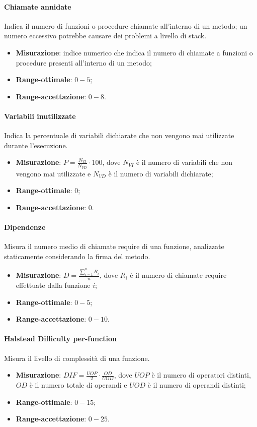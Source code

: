 \paragraph{Chiamate annidate}
Indica il numero di funzioni o procedure chiamate all'interno di un metodo; un numero eccessivo potrebbe causare dei problemi a livello di stack.
\begin{itemize}
\item \textbf{Misurazione}: indice numerico che indica il numero di chiamate a funzioni o procedure presenti all'interno di un metodo;
\item \textbf{Range-ottimale}: $0 - 5$;
\item \textbf{Range-accettazione}: $0 - 8$.
\end{itemize}
\paragraph{Variabili inutilizzate}
\label{variabInutilizz}
Indica la percentuale di variabili dichiarate che non vengono mai utilizzate durante l'esecuzione.
\begin{itemize}
\item \textbf{Misurazione}: $P = \frac{N_{VI}}{N_{VD}} \cdot 100$, dove $N_{VI}$ è il numero di variabili che non vengono mai utilizzate e $N_{VD}$ è il numero di variabili dichiarate;
\item \textbf{Range-ottimale}: $0$;
\item \textbf{Range-accettazione}: $0$.
\end{itemize}
\paragraph{Dipendenze}
\label{dipendenze}
Misura il numero medio di chiamate require di una funzione, analizzate staticamente considerando la firma del metodo.
\begin{itemize}
\item \textbf{Misurazione}: $D = \frac{\sum_{i=1}^{n} R_{i}}{n}$, dove $R_{i}$ è il numero di chiamate require effettuate dalla funzione $i$;
\item \textbf{Range-ottimale}: $0 - 5$;
\item \textbf{Range-accettazione}: $0 - 10$.
\end{itemize}
\paragraph{Halstead Difficulty per-function}
\label{halDiff}
Misura il livello di complessità di una funzione.
\begin{itemize}
\item \textbf{Misurazione}: $DIF = \frac{UOP}{2} \cdot \frac{OD}{UOD}$, dove $UOP$ è il numero di operatori distinti, $OD$ è il numero totale di operandi e $UOD$ è il numero di operandi distinti;
\item \textbf{Range-ottimale}: $0 - 15$;
\item \textbf{Range-accettazione}: $0 - 25$.
\end{itemize}
